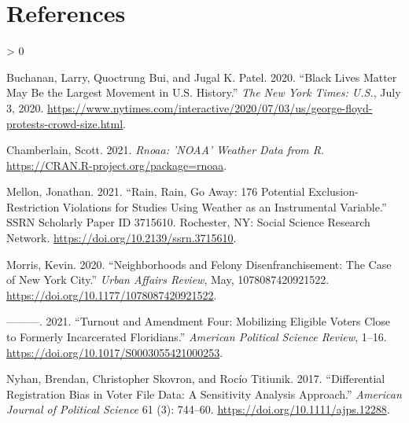 \documentclass[
  12pt,
]{article}
\newlength{\cslhangindent}
\newenvironment{CSLReferences}[2] %
 {%
  \setlength{\parindent}{0pt}
  \ifodd #1 \everypar{\setlength{\hangindent}{\cslhangindent}}\ignorespaces\fi
  \ifnum #2 > 0
  \setlength{\parskip}{#2\baselineskip}
  \fi
 }%
 {}
\begin{document}
\hypertarget{references}{%
\section*{References}\label{references}}

\hypertarget{refs}{}
\begin{CSLReferences}{1}{0}
\leavevmode\hypertarget{ref-Buchanan2020}{}%
Buchanan, Larry, Quoctrung Bui, and Jugal K. Patel. 2020. {``Black {Lives Matter May Be} the {Largest Movement} in {U}.{S}. {History}.''} \emph{The New York Times: U.S.}, July 3, 2020. \url{https://www.nytimes.com/interactive/2020/07/03/us/george-floyd-protests-crowd-size.html}.

\leavevmode\hypertarget{ref-Chamberlain2021}{}%
Chamberlain, Scott. 2021. \emph{Rnoaa: '{NOAA}' {Weather Data} from {R}}. \url{https://CRAN.R-project.org/package=rnoaa}.

\leavevmode\hypertarget{ref-Mellon2021}{}%
Mellon, Jonathan. 2021. {``Rain, {Rain}, {Go Away}: 176 {Potential Exclusion}-{Restriction Violations} for {Studies Using Weather} as an {Instrumental Variable}.''} SSRN Scholarly Paper ID 3715610. {Rochester, NY}: {Social Science Research Network}. \url{https://doi.org/10.2139/ssrn.3715610}.

\leavevmode\hypertarget{ref-Morris2020}{}%
Morris, Kevin. 2020. {``Neighborhoods and {Felony Disenfranchisement}: {The Case} of {New York City}.''} \emph{Urban Affairs Review}, May, 1078087420921522. \url{https://doi.org/10.1177/1078087420921522}.

\leavevmode\hypertarget{ref-Morris2021}{}%
---------. 2021. {``Turnout and {Amendment Four}: {Mobilizing Eligible Voters Close} to {Formerly Incarcerated Floridians}.''} \emph{American Political Science Review}, 1--16. \url{https://doi.org/10.1017/S0003055421000253}.

\leavevmode\hypertarget{ref-Nyhan2017}{}%
Nyhan, Brendan, Christopher Skovron, and Rocío Titiunik. 2017. {``Differential {Registration Bias} in {Voter File Data}: {A Sensitivity Analysis Approach}.''} \emph{American Journal of Political Science} 61 (3): 744--60. \url{https://doi.org/10.1111/ajps.12288}.

\end{CSLReferences}
\end{document}
